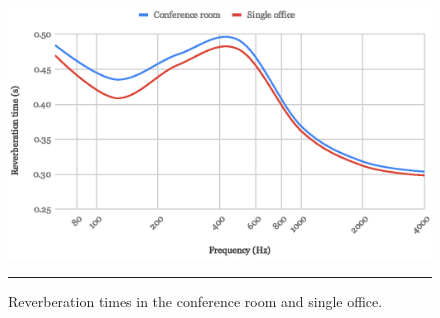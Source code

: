 \begin{figure}[htbp]
	\centering
	\includegraphics[width=\textwidth]{figures/Reverb_times.eps}
	\rule{\textwidth}{0.5pt} %
	\caption{Reverberation times in the conference room and single office.}
	\label{fig:reverb_times}
\end{figure}